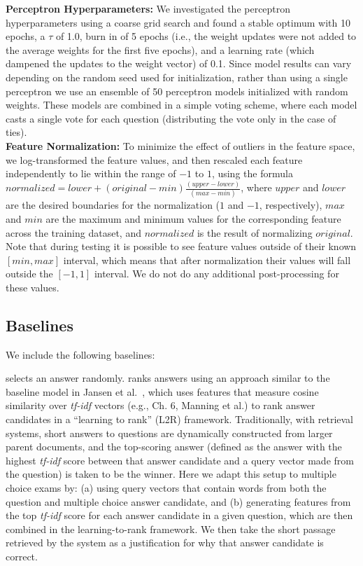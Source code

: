 {\flushleft \textbf{Perceptron Hyperparameters:}} We investigated the perceptron hyperparameters using a coarse grid search and found a stable optimum with 10 epochs, a $\tau$ of 1.0, burn in of 5 epochs (i.e., the weight updates were not added to the average weights for the first five epochs), and a learning rate (which dampened the updates to the weight vector) of 0.1. Since model results can vary depending on the random seed used for initialization, rather than using a single perceptron we use an ensemble of 50 perceptron models initialized with random weights.  These models are combined in a simple voting scheme, where each model casts a single vote for each question (distributing the vote only in the case of ties).\\

{\flushleft \textbf{Feature Normalization:}} To minimize the effect of outliers in the feature space, we log-transformed the feature values, and then rescaled each feature independently to lie within the range of $-1$ to $1$, using the formula
\mbox{$normalized  = lower + (original - min)\frac{(upper - lower)}{(max - min)}$},
where $upper$ and $lower$ are the desired boundaries for the normalization ($1$ and $-1$, respectively), $max$ and $min$ are the maximum and minimum values for the corresponding feature across the training dataset, and $normalized$ is the result of normalizing $original$.
Note that during testing it is possible to see feature values outside of their known $[min, max]$ interval, which means that after normalization their values will fall outside the $[-1, 1]$ interval. We do not do any additional post-processing for these values.


\subsection{Baselines}
\label{sec:baselines}

We include the following baselines: 

{} selects an answer randomly.
{} ranks answers using an approach similar to the baseline model in Jansen et al.~, which uses features that measure cosine similarity over {\em tf-idf} vectors (e.g., Ch. 6, Manning et al.) to rank answer candidates in a ``learning to rank'' (L2R) framework.  
Traditionally, with retrieval systems, short answers to questions are dynamically constructed from larger parent documents, and the top-scoring answer (defined as the answer with the highest {\em tf-idf} score between that answer candidate and a query vector made from the question) is taken to be the winner.  Here we adapt this setup to multiple choice exams by: (a) using query vectors that contain words from both the question and multiple choice answer candidate, and (b) generating features from the top {\em tf-idf} score for each answer candidate in a given question, which are then combined in the learning-to-rank framework.  We then take the short passage retrieved by the system as a justification for why that answer candidate is correct. 

